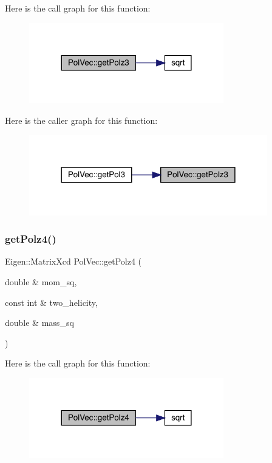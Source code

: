 Here is the call graph for this function\+:
\nopagebreak
\begin{figure}[H]
\begin{center}
\leavevmode
\includegraphics[width=240pt]{d7/d0c/namespacePolVec_a8671b890f81a976ae4f806cf53ae61df_cgraph}
\end{center}
\end{figure}
Here is the caller graph for this function\+:
\nopagebreak
\begin{figure}[H]
\begin{center}
\leavevmode
\includegraphics[width=294pt]{d7/d0c/namespacePolVec_a8671b890f81a976ae4f806cf53ae61df_icgraph}
\end{center}
\end{figure}
\mbox{\label{namespacePolVec_a51d6ba884df8fd4c9466477aae902ec7}} 
\subsubsection{\texorpdfstring{getPolz4()}{getPolz4()}}
{\footnotesize\ttfamily Eigen\+::\+Matrix\+Xcd Pol\+Vec\+::get\+Polz4 (\begin{DoxyParamCaption}\item[{double \&}]{mom\+\_\+sq,  }\item[{const int \&}]{two\+\_\+helicity,  }\item[{double \&}]{mass\+\_\+sq }\end{DoxyParamCaption})}

Here is the call graph for this function\+:
\nopagebreak
\begin{figure}[H]
\begin{center}
\leavevmode
\includegraphics[width=240pt]{d7/d0c/namespacePolVec_a51d6ba884df8fd4c9466477aae902ec7_cgraph}
\end{center}
\end{figure}
